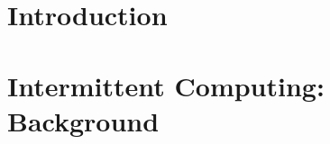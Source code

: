\documentclass[pageno]{jpaper}
\newcommand{\sys}{Coala\xspace}
\begin{document}
%
%
\begin{abstract}	

\end{abstract}
%
%
%
%
%
\section{Introduction}
\label{sec:intro}
%

%
\section{Intermittent Computing: Background}
\label{sec:background}
%

%
\end{document}
